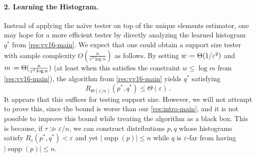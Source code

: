 \documentclass{theoretics}
\newcommand*\ie{i.\kern.1em e.\ }
\newcommand{\ignore}[1]{}
\DeclareMathOperator{\supp}{supp}   %
\newcommand*{\define}{\mathrel{\vcenter{\baselineskip0.5ex \lineskiplimit0pt
                      \hbox{\scriptsize.}\hbox{\scriptsize.}}}%
                      =}
\renewcommand{\epsilon}{\varepsilon}
\begin{document}
\paragraph*{2. Learning the Histogram.} Instead of applying the na\"ive tester on
top of the unique elements estimator, one may hope for a more efficient tester by directly analyzing
the learned histogram $q^*$ from \cref{res:vv16-main}. We expect that one could obtain a support
size tester with sample complexity $O(\frac{n}{\epsilon^3 \log n})$ as follows. By setting $w
\define \Theta(1/\epsilon^2)$ and $m \define \Theta(\frac{n}{\epsilon^3 \log n})$ (at least when
this satisfies the constraint $w \le \log m$ from \cref{res:vv16-main}), the algorithm from
\cref{res:vv16-main} yields $q^*$ satisfying
\begin{equation}
    \label{eq:remd-bound}
    R_{\Theta(\epsilon/n)}(p^*, q^*) \le \Theta(\epsilon) \,.
\end{equation}
It appears that this suffices for testing support size. However, we will not attempt to prove this,
since the bound is worse than our \cref{res:intro-main}, and it is not possible to improve this
bound while treating the algorithm as a black box. This is because, if $\tau \gg \epsilon/n$, we can
construct distributions $p,q$ whose histograms satisfy $R_\tau(p^*,q^*) < \epsilon$ and yet
$|\supp(p)| \leq n$ while $q$ is $\epsilon$-far from having $|\supp(p)| \leq n$.

\ignore{%
We may construct probability distributions $p$ and $p'$ such that $p$ has support
size $n$, and in particular assigns probability $4\epsilon/n$ to each of $n/2$ elements (for a total
of $2\epsilon$ mass), while $p'$ is obtained from $p$ by splitting each of those $n/2$ elements into
two elements assigned equal probability $2\epsilon/n$, so that $p'$ is $\epsilon$-far from having
support size $n$. The (non-truncated) relative earth-mover distance between $p$ and $p'$ is
$\Theta(\epsilon)$ (and indeed so is the TV distance between them), suggesting that we cannot make
the right-hand side of \eqref{eq:remd-bound} any larger if we wish to distinguish between $p$ and
$p'$, \ie we should set $w = \Omega(1/\epsilon^2)$. Then, if the threshold $\tau$ for the truncated
relative earth-mover distance $R_\tau$ is $\tau \gg \epsilon/n$, the distributions $p$ and $p'$
would be indistinguishable under $R_\tau$, so we must have $\frac{w}{m \log m} = O(\epsilon/n)$.
Since $w = \Omega(1/\epsilon^2)$, we are forced to set $m = \Omega(\frac{n}{\epsilon^3 \log n})$.
}

 
\end{document}
